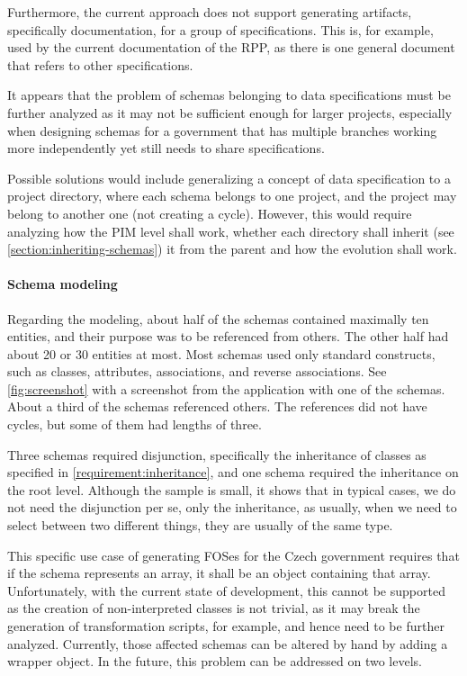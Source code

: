 Furthermore, the current approach does not support generating artifacts, specifically documentation, for a group of specifications. This is, for example, used by the current documentation of the RPP, as there is one general document that refers to other specifications.

It appears that the problem of schemas belonging to data specifications must be further analyzed as it may not be sufficient enough for larger projects, especially when designing schemas for a government that has multiple branches working more independently yet still needs to share specifications.

Possible solutions would include generalizing a concept of data specification to a project directory, where each schema belongs to one project, and the project may belong to another one (not creating a cycle). However, this would require analyzing how the PIM level shall work, whether each directory shall inherit (see \autoref{section:inheriting-schemas}) it from the parent and how the evolution shall work.

\paragraph{Schema modeling} Regarding the modeling, about half of the schemas contained maximally ten entities, and their purpose was to be referenced from others. The other half had about 20 or 30 entities at most. Most schemas used only standard constructs, such as classes, attributes, associations, and reverse associations. See \autoref{fig:screenshot} with a screenshot from the application with one of the schemas. About a third of the schemas referenced others. The references did not have cycles, but some of them had lengths of three.

Three schemas required disjunction, specifically the inheritance of classes as specified in \autoref{requirement:inheritance}, and one schema required the inheritance on the root level. Although the sample is small, it shows that in typical cases, we do not need the disjunction per se, only the inheritance, as usually, when we need to select between two different things, they are usually of the same type.

\smallskip

This specific use case of generating FOSes for the Czech government requires that if the schema represents an array, it shall be an object containing that array. Unfortunately, with the current state of development, this cannot be supported as the creation of non-interpreted classes is not trivial, as it may break the generation of transformation scripts, for example, and hence need to be further analyzed. Currently, those affected schemas can be altered by hand by adding a wrapper object. In the future, this problem can be addressed on two levels.

